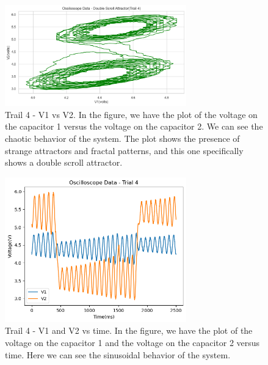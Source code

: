 \documentclass[12pt]{article}
\begin{document}
        \begin{figure}[h!]
                \centering
                \includegraphics[width=0.7\textwidth]{./img/plots/Trail4_VonV.png}
                \caption{Trail 4 - V1 vs V2. In the figure, we have the plot of the voltage on the capacitor 1 versus the voltage on the capacitor 2. 
                We can see the chaotic behavior of the system. The plot shows the presence of strange attractors and fractal patterns, and this one specifically shows a double scroll attractor.}
                \label{fig: Trail 4 - V on V.}
        \end{figure} \pagebreak
        \begin{figure}[h!]
                \centering
                \includegraphics[width=0.7\textwidth]{./img/plots/Trail4_O.png}
                \caption{Trail 4 - V1 and V2 vs time. In the figure, we have the plot of the voltage on the capacitor 1 and the voltage on the capacitor 2 versus time. 
                Here we can see the sinusoidal behavior of the system. }
        \end{figure}
\end{document}
